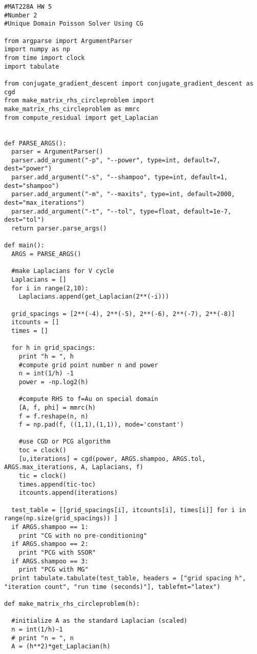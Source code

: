 \documentclass[12pt]{article}
\begin{document}
\begin{verbatim}
#MAT228A HW 5
#Number 2
#Unique Domain Poisson Solver Using CG

from argparse import ArgumentParser
import numpy as np
from time import clock
import tabulate

from conjugate_gradient_descent import conjugate_gradient_descent as cgd
from make_matrix_rhs_circleproblem import make_matrix_rhs_circleproblem as mmrc
from compute_residual import get_Laplacian


def PARSE_ARGS():
  parser = ArgumentParser()
  parser.add_argument("-p", "--power", type=int, default=7, dest="power")
  parser.add_argument("-s", "--shampoo", type=int, default=1, dest="shampoo")
  parser.add_argument("-m", "--maxits", type=int, default=2000, dest="max_iterations")
  parser.add_argument("-t", "--tol", type=float, default=1e-7, dest="tol")
  return parser.parse_args()  

def main():
  ARGS = PARSE_ARGS()

  #make Laplacians for V cycle
  Laplacians = []
  for i in range(2,10):
    Laplacians.append(get_Laplacian(2**(-i)))

  grid_spacings = [2**(-4), 2**(-5), 2**(-6), 2**(-7), 2**(-8)]
  itcounts = []
  times = [] 
  
  for h in grid_spacings:
    print "h = ", h
    #compute grid point number n and power
    n = int(1/h) -1
    power = -np.log2(h)

    #compute RHS to f=Au on special domain
    [A, f, phi] = mmrc(h)
    f = f.reshape(n, n)
    f = np.pad(f, ((1,1),(1,1)), mode='constant')
    
    #use CGD or PCG algorithm
    toc = clock()
    [u,iterations] = cgd(power, ARGS.shampoo, ARGS.tol, ARGS.max_iterations, A, Laplacians, f)
    tic = clock()
    times.append(tic-toc)
    itcounts.append(iterations)

  test_table = [[grid_spacings[i], itcounts[i], times[i]] for i in range(np.size(grid_spacings)) ]
  if ARGS.shampoo == 1:
    print "CG with no pre-conditioning"
  if ARGS.shampoo == 2:
    print "PCG with SSOR"
  if ARGS.shampoo == 3:
    print "PCG with MG" 
  print tabulate.tabulate(test_table, headers = ["grid spacing h", "iteration count", "run time (seconds)"], tablefmt="latex")

def make_matrix_rhs_circleproblem(h):

  #initialize A as the standard Laplacian (scaled)
  n = int(1/h)-1
  # print "n = ", n
  A = (h**2)*get_Laplacian(h)


\end{verbatim}
\end{document}
